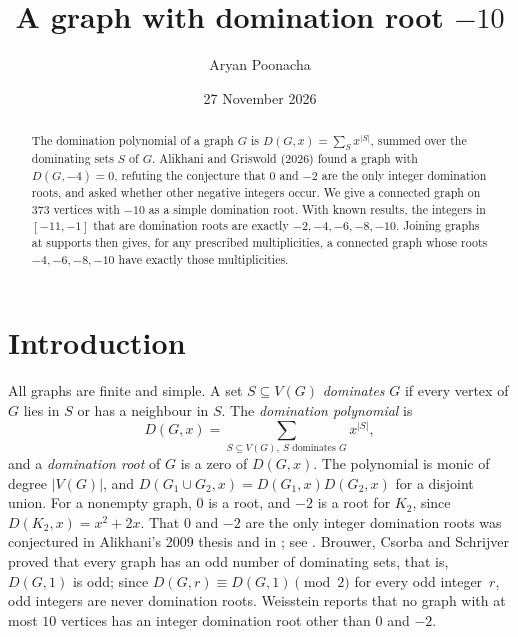 \documentclass[11pt]{amsart}
\title[A domination root at $-10$]{A graph with domination root $-10$}
\author{Aryan Poonacha}
\date{27 November 2026}
\theoremstyle{remark}
\begin{document}
\begin{abstract}
The domination polynomial of a graph $G$ is $D(G,x)=\sum_S x^{|S|}$, summed over
the dominating sets $S$ of $G$. Alikhani and Griswold (2026) found a graph with
$D(G,-4)=0$, refuting the conjecture that $0$ and $-2$ are the only integer
domination roots, and asked whether other negative integers occur. We give a
connected graph on $373$ vertices with $-10$ as a simple domination root. With
known results, the integers in $[-11,-1]$ that are domination roots are exactly
$-2,-4,-6,-8,-10$. Joining graphs at supports then gives, for any prescribed
multiplicities, a connected graph whose roots $-4,-6,-8,-10$ have exactly those
multiplicities.
\end{abstract}
\maketitle

\section{Introduction}

All graphs are finite and simple. A set $S\subseteq V(G)$ \emph{dominates} $G$
if every vertex of $G$ lies in $S$ or has a neighbour in $S$. The
\emph{domination polynomial} is
\[
  D(G,x)=\sum_{S\subseteq V(G),\ S \text{ dominates } G} x^{|S|},
\]
and a \emph{domination root} of $G$ is a zero of $D(G,x)$. The polynomial is
monic of degree $|V(G)|$, and $D(G_1\cup G_2,x)=D(G_1,x)D(G_2,x)$ for a disjoint
union. For a nonempty graph, $0$ is a root, and $-2$ is a root for $K_2$, since
$D(K_2,x)=x^2+2x$. That $0$ and $-2$ are the only integer domination roots was
conjectured in Alikhani's 2009 thesis and in \cite{AAOP10}; see
\cite[Conjecture~1.1]{AG26}. Brouwer, Csorba and Schrijver \cite{BCS09} proved that every
graph has an odd number of dominating sets, that is, $D(G,1)$ is odd; since
$D(G,r)\equiv D(G,1)\pmod 2$ for every odd integer~$r$, odd integers are never
domination roots. Weisstein \cite{Wei} reports that no graph with at most $10$
vertices has an integer domination root other than $0$ and $-2$.
\end{document}
